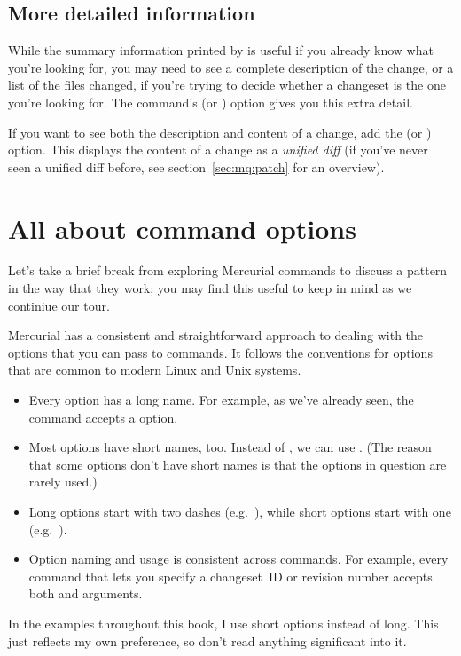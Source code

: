 \subsection{More detailed information}

While the summary information printed by  is useful if you
already know what you're looking for, you may need to see a complete
description of the change, or a list of the files changed, if you're
trying to decide whether a changeset is the one you're looking for.
The  command's  (or )
option gives you this extra detail.

If you want to see both the description and content of a change, add
the  (or ) option.  This displays
the content of a change as a \emph{unified diff} (if you've never seen
a unified diff before, see section~\ref{sec:mq:patch} for an overview).

\section{All about command options}

Let's take a brief break from exploring Mercurial commands to discuss
a pattern in the way that they work; you may find this useful to keep
in mind as we continiue our tour.

Mercurial has a consistent and straightforward approach to dealing
with the options that you can pass to commands.  It follows the
conventions for options that are common to modern Linux and Unix
systems.
\begin{itemize}
\item Every option has a long name.  For example, as we've already
  seen, the  command accepts a  option.
\item Most options have short names, too.  Instead of
  , we can use .  (The reason that
  some options don't have short names is that the options in question
  are rarely used.)
\item Long options start with two dashes (e.g.~),
  while short options start with one (e.g.~).
\item Option naming and usage is consistent across commands.  For
  example, every command that lets you specify a changeset~ID or
  revision number accepts both  and 
  arguments.
\end{itemize}
In the examples throughout this book, I use short options instead of
long.  This just reflects my own preference, so don't read anything
significant into it.

